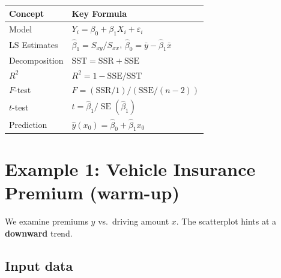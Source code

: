 \documentclass[
  letterpaper,
]{scrbook}
\begin{document}
\begin{longtable}[]{@{}
  >{\raggedright\arraybackslash}p{}
  >{\raggedright\arraybackslash}p{}@{}}
\toprule\noalign{}
\begin{minipage}[b]{\linewidth}\raggedright
Concept
\end{minipage} & \begin{minipage}[b]{\linewidth}\raggedright
Key Formula
\end{minipage} \\
\midrule\noalign{}
\endhead
\bottomrule\noalign{}
\endlastfoot
Model & \(Y_i = \beta_0 + \beta_1 X_i + \varepsilon_i\) \\
LS Estimates & \(\hat\beta_1 = S_{xy}/S_{xx}\),
\(\hat\beta_0 = \bar y - \hat\beta_1\bar x\) \\
Decomposition & \(\mathrm{SST} = \mathrm{SSR} + \mathrm{SSE}\) \\
\(R^2\) & \(R^2 = 1 - \mathrm{SSE}/\mathrm{SST}\) \\
\(F\)-test & \(F = (\mathrm{SSR}/1)/(\mathrm{SSE}/(n-2))\) \\
\(t\)-test & \(t = \hat\beta_1 / \operatorname{SE}(\hat\beta_1)\) \\
Prediction & \(\hat y(x_0) = \hat\beta_0 + \hat\beta_1 x_0\) \\
\end{longtable}

\section{Example 1: Vehicle Insurance Premium
(warm-up)}\label{example-1-vehicle-insurance-premium-warm-up}

We examine premiums \(y\) vs.~driving amount \(x\). The scatterplot
hints at a \textbf{downward} trend.

\subsection{Input data}\label{input-data}
\end{document}
